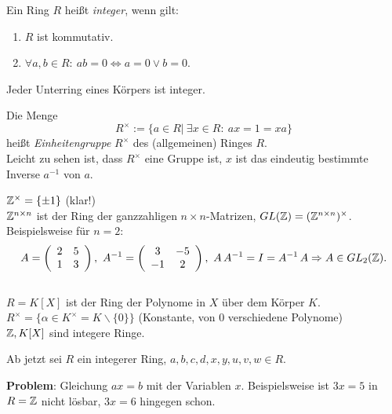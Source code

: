 \documentclass[a4paper,DIV15,BCOR12mm]{article}
\begin{document}
\begin{definition}
Ein Ring $R$ heißt \emph{integer}, wenn gilt:
\begin{enumerate}
\item $R$ ist kommutativ.
\item $\forall a,b \in R:\ ab=0 \iff a=0 \vee b=0$.
\end{enumerate}
\end{definition}
\begin{beispiel}
    Jeder Unterring eines Körpers ist integer.
\end{beispiel}
\begin{definition}
    Die Menge
    $$
    R^{\times}:=\{a \in R|\ \exists x \in R:\ ax=1=xa\}
    $$
    heißt \emph{Einheitengruppe} $R^{\times}$ des (allgemeinen)
    Ringes $R$.\\
    Leicht zu sehen ist, dass $R^{\times}$ eine Gruppe ist, $x$ ist
    das eindeutig bestimmte Inverse $a^{-1}$ von $a$.
\end{definition}
\begin{beispiel}
    $\mathbb{Z}^{\times}=\{\pm 1\}$ (klar!)\\
    $\mathbb{Z}^{n \times n}$ ist der Ring der ganzzahligen $n\times
    n$-Matrizen, $GL(\mathbb{Z})=(\mathbb{Z}^{n \times n})^{\times}$.
    Beispielsweise für $n=2$:\\
    $$
    A=\left(
        \begin{array}{cc}
          2 & 5 \\
          1 & 3 \\
        \end{array}
      \right),\ A^{-1}=\left(
        \begin{array}{cc}
          3 & -5 \\
          -1 & 2 \\
        \end{array}
      \right),\ A\,A^{-1}=I=A^{-1}\,A \Rightarrow A \in GL_2(\mathbb{Z}).
    $$\\
    $R=K[X]$ ist der Ring der Polynome in $X$ über dem Körper $K$.
    $R^{\times}=\{\alpha \in K^{\times}=K\backslash \{0\}\}$ (Konstante,
    von $0$ verschiedene Polynome)\\
    $\mathbb{Z}, K[X]$ sind integere Ringe.
\end{beispiel}
Ab jetzt sei $R$ ein integerer Ring, $a,b,c,d,x,y,u,v,w \in R$.

\textbf{Problem}: Gleichung $ax=b$ mit der Variablen $x$.
Beispielsweise ist $3x=5$ in $R=\mathbb{Z}$ nicht lösbar, $3x=6$ hingegen
schon.
\end{document}

